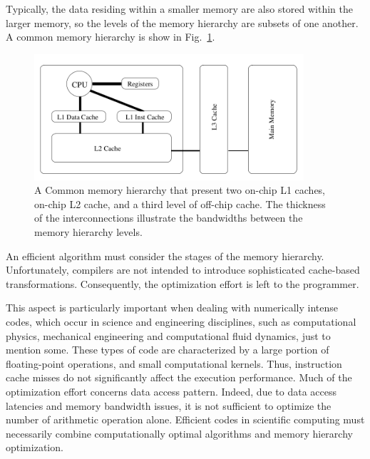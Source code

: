 Typically, the data residing within a smaller memory are also stored within the larger memory, so the levels of the memory hierarchy are subsets of one another. A common memory hierarchy is show in Fig.~\ref{fig:memory-hierarchy}.
\begin{figure}
   \centering
   \includegraphics[width=10cm]{Figs/Memory_hierarchy.png}
   \caption{A Common memory hierarchy that present two on-chip L1 caches, on-chip L2 cache, and a third level of off-chip cache. The thickness of the interconnections illustrate the bandwidths between the memory hierarchy levels.} \label{fig:memory-hierarchy}
\end{figure} 

An efficient algorithm must consider the stages of the memory hierarchy. Unfortunately, compilers are not intended to introduce sophisticated cache-based transformations. Consequently, the optimization effort is left to the programmer. 

This aspect is particularly important when dealing with numerically intense codes, which occur in science and engineering disciplines, such as computational physics, mechanical engineering and computational fluid dynamics, just to mention some. These types of code are characterized by a large portion of floating-point operations, and small computational kernels. Thus, instruction cache misses do not significantly affect the execution performance. Much of the optimization effort concerns data access pattern. Indeed, due to data access latencies and memory bandwidth issues, it is not sufficient to optimize the number of arithmetic operation alone. Efficient codes in scientific computing must necessarily combine computationally optimal algorithms and memory hierarchy optimization.

